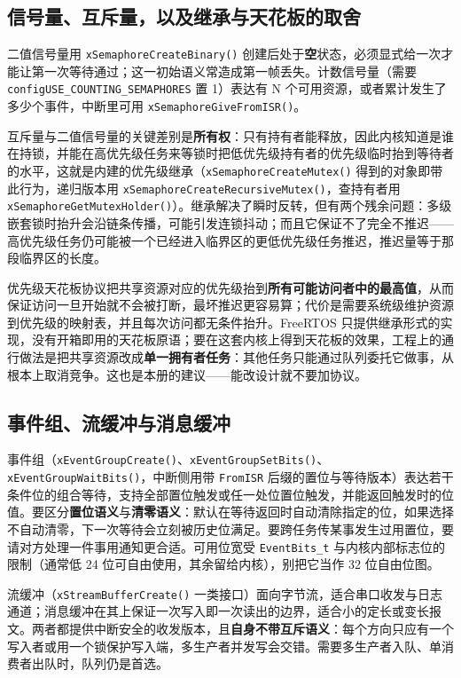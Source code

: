 \documentclass[12pt,a4paper,fontset=fandol]{ctexbook}
\newcommand{\Fn}[1]{\texttt{#1()}}
\newcommand{\Tp}[1]{\texttt{#1}}
\newcommand{\Bk}{\discretionary{}{}{}}
\begin{document}
\subsection{信号量、互斥量，以及继承与天花板的取舍}

二值信号量用 \Fn{xSemaphoreCreateBinary} 创建后处于\textbf{空}状态，必须显式给一次才能让第一次等待通过；这一初始语义常造成第一帧丢失。计数信号量（需要 \Tp{configUSE\_{\Bk}COUNTING\_{\Bk}SEMAPHORES} 置 1）表达有 N 个可用资源，或者累计发生了多少个事件，中断里可用 \Fn{xSemaphoreGiveFromISR}。

互斥量与二值信号量的关键差别是\textbf{所有权}：只有持有者能释放，因此内核知道是谁在持锁，并能在高优先级任务来等锁时把低优先级持有者的优先级临时抬到等待者的水平，这就是内建的优先级继承（\Fn{xSemaphoreCreateMutex} 得到的对象即带此行为，递归版本用 \Fn{xSemaphoreCreateRecursiveMutex}，查持有者用 \Fn{xSemaphoreGetMutexHolder}）。继承解决了瞬时反转，但有两个残余问题：多级嵌套锁时抬升会沿链条传播，可能引发连锁抖动；而且它保证不了完全不推迟——高优先级任务仍可能被一个已经进入临界区的更低优先级任务推迟，推迟量等于那段临界区的长度。

优先级天花板协议把共享资源对应的优先级抬到\textbf{所有可能访问者中的最高值}，从而保证访问一旦开始就不会被打断，最坏推迟更容易算；代价是需要系统级维护资源到优先级的映射表，并且每次访问都无条件抬升。FreeRTOS 只提供继承形式的实现，没有开箱即用的天花板原语；要在这套内核上得到天花板的效果，工程上的通行做法是把共享资源改成\textbf{单一拥有者任务}：其他任务只能通过队列委托它做事，从根本上取消竞争。这也是本册的建议——能改设计就不要加协议。

\subsection{事件组、流缓冲与消息缓冲}

事件组（\Fn{xEventGroupCreate}、\Fn{xEventGroupSetBits}、\Fn{xEventGroupWaitBits}，中断侧用带 \Tp{FromISR} 后缀的置位与等待版本）表达若干条件位的组合等待，支持全部置位触发或任一处位置位触发，并能返回触发时的位值。要区分\textbf{置位语义}与\textbf{清零语义}：默认在等待返回时自动清除指定的位，如果选择不自动清零，下一次等待会立刻被历史位满足。要跨任务传某事发生过用置位，要请对方处理一件事用通知更合适。可用位宽受 \Tp{EventBits\_t} 与内核内部标志位的限制（通常低 24 位可自由使用，其余留给内核），别把它当作 32 位自由位图。

流缓冲（\Fn{xStreamBufferCreate} 一类接口）面向字节流，适合串口收发与日志通道；消息缓冲在其上保证一次写入即一次读出的边界，适合小的定长或变长报文。两者都提供中断安全的收发版本，且\textbf{自身不带互斥语义}：每个方向只应有一个写入者或用一个锁保护写入端，多生产者并发写会交错。需要多生产者入队、单消费者出队时，队列仍是首选。
\end{document}
